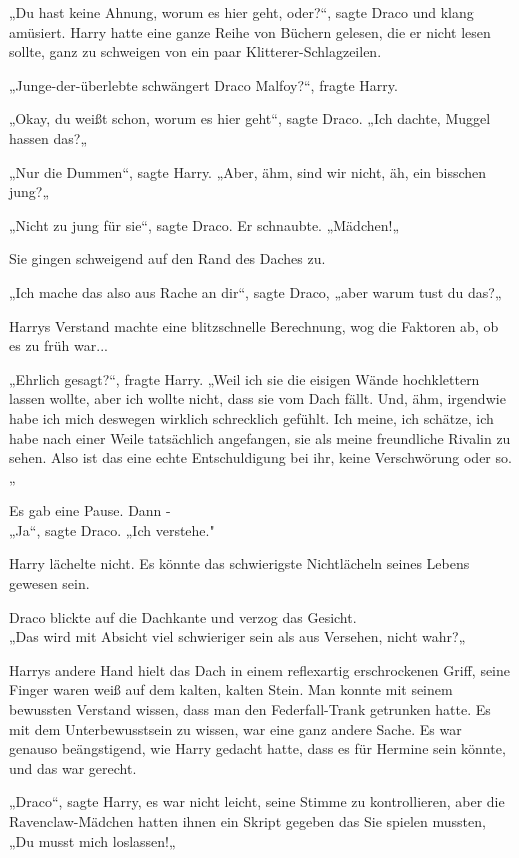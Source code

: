 {„Du hast keine Ahnung, worum es hier geht, oder?“, sagte Draco und klang amüsiert. Harry hatte eine ganze Reihe von Büchern gelesen, die er nicht lesen sollte, ganz zu schweigen von ein paar Klitterer-Schlagzeilen.

„Junge-der-überlebte schwängert Draco Malfoy?“, fragte Harry.

„Okay, du weißt schon, worum es hier geht“, sagte Draco. „Ich dachte, Muggel hassen das?„

„Nur die Dummen“, sagte Harry. „Aber, ähm, sind wir nicht, äh, ein bisschen jung?„

„Nicht zu jung für sie“, sagte Draco. Er schnaubte. „Mädchen!„

Sie gingen schweigend auf den Rand des Daches zu.

„Ich mache das also aus Rache an dir“, sagte Draco, „aber warum tust du das?„

Harrys Verstand machte eine blitzschnelle Berechnung, wog die Faktoren ab, ob es zu früh war...

„Ehrlich gesagt?“, fragte Harry. „Weil ich sie die eisigen Wände hochklettern lassen wollte, aber ich wollte nicht, dass sie vom Dach fällt. Und, ähm, irgendwie habe ich mich deswegen wirklich schrecklich gefühlt. Ich meine, ich schätze, ich habe nach einer Weile tatsächlich angefangen, sie als meine freundliche Rivalin zu sehen. Also ist das eine echte Entschuldigung bei ihr, keine Verschwörung oder so.„

Es gab eine Pause. Dann -\\ „Ja“, sagte Draco. „Ich verstehe."

Harry lächelte nicht. Es könnte das schwierigste Nichtlächeln seines Lebens gewesen sein.

Draco blickte auf die Dachkante und verzog das Gesicht.\\ „Das wird mit Absicht viel schwieriger sein als aus Versehen, nicht wahr?„

Harrys andere Hand hielt das Dach in einem reflexartig erschrockenen Griff, seine Finger waren weiß auf dem kalten, kalten Stein. Man konnte mit seinem bewussten Verstand wissen, dass man den Federfall-Trank getrunken hatte. Es mit dem Unterbewusstsein zu wissen, war eine ganz andere Sache. Es war genauso beängstigend, wie Harry gedacht hatte, dass es für Hermine sein könnte, und das war gerecht.

„Draco“, sagte Harry, es war nicht leicht, seine Stimme zu kontrollieren, aber die Ravenclaw-Mädchen hatten ihnen ein Skript gegeben das Sie spielen mussten, „Du musst mich loslassen!„

}
